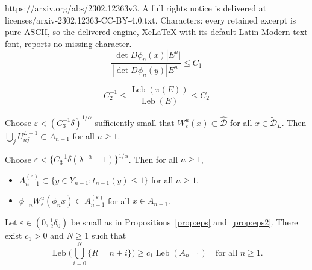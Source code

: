 \documentclass[10pt,a4paper]{amsart}
\newcommand{\Leb}{\operatorname{Leb}}
\newcommand{\eps}{\varepsilon}
\newcommand{\hcD}{{\widehat {\mathcal D}}}
\newcommand{\tcD}{{\widetilde {\mathcal D}}}
\begin{document}
https://arxiv.org/abs/2302.12363v3. A full rights notice is delivered at licenses/arxiv-2302.12363-CC-BY-4.0.txt. Characters: every retained excerpt is pure ASCII, so the delivered engine, XeLaTeX with its default Latin Modern text font, reports no missing character.
\begin{equation}\label{eq:bdd}
\frac{|\det D\phi_n(x)|E^u|}{|\det D\phi_n(y)|E^u|} \leq C_1
\end{equation}

\begin{equation}\label{eq:bddpi}
C_2^{-1}\le \frac{\Leb(\pi(E))}{\Leb(E)} \leq C_2
\end{equation}

\begin{prop} \label{prop:eps}
Choose $\eps<(C_3^{-1}\delta)^{1/\alpha}$ sufficiently small that $W^u_\eps(x)\subset\hcD$ for all $x\in\tcD_L$. Then
 $\bigcup_jU_{nj}^{L-1}\subset A_{n-1}$ for all $n\ge1$.
\end{prop}

\begin{prop} \label{prop:eps2}
Choose $\eps<\big\{C_3^{-1}\delta(\lambda^{-\alpha}-1)\big\}^{1/\alpha}$.
Then for all $n\ge1$,
\begin{itemize}
\item[(a)]
$A_{n-1}^{(\eps)}\subset \{y\in Y_{n-1}:t_{n-1}(y)\le 1\}$ for all $n\ge1$.
\item[(b)]
$\phi_{-n}W_\eps^u(\phi_nx)\subset A_{n-1}^{(\eps)}$ for all $x\in A_{n-1}$.
\end{itemize}
\end{prop}

\begin{lemma} \label{lem:keyfact}
Let $\eps\in(0,\frac12\delta_0)$ be small as in Propositions~\ref{prop:eps} and~\ref{prop:eps2}.
There exist $c_1>0$ and $N\ge1$ such that 
\[
\Leb\Big(\bigcup_{i=0}^{N} \{R=n+i\}\Big)\ge c_1 \Leb(A_{n-1})
\quad\text{for all $n\ge1$}.
\]
\end{lemma}
\end{document}
